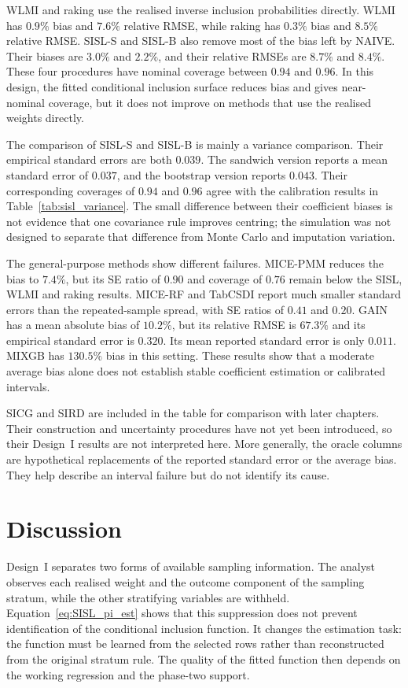 WLMI and raking use the realised inverse inclusion probabilities directly. WLMI has $0.9\%$ bias and $7.6\%$ relative RMSE, while raking has $0.3\%$ bias and $8.5\%$ relative RMSE. SISL-S and SISL-B also remove most of the bias left by NAIVE. Their biases are $3.0\%$ and $2.2\%$, and their relative RMSEs are $8.7\%$ and $8.4\%$. These four procedures have nominal coverage between $0.94$ and $0.96$. In this design, the fitted conditional inclusion surface reduces bias and gives near-nominal coverage, but it does not improve on methods that use the realised weights directly.

The comparison of SISL-S and SISL-B is mainly a variance comparison. Their empirical standard errors are both $0.039$. The sandwich version reports a mean standard error of $0.037$, and the bootstrap version reports $0.043$. Their corresponding coverages of $0.94$ and $0.96$ agree with the calibration results in Table~\ref{tab:sisl_variance}. The small difference between their coefficient biases is not evidence that one covariance rule improves centring; the simulation was not designed to separate that difference from Monte Carlo and imputation variation.

The general-purpose methods show different failures. MICE-PMM reduces the bias to $7.4\%$, but its SE ratio of $0.90$ and coverage of $0.76$ remain below the SISL, WLMI and raking results. MICE-RF and TabCSDI report much smaller standard errors than the repeated-sample spread, with SE ratios of $0.41$ and $0.20$. GAIN has a mean absolute bias of $10.2\%$, but its relative RMSE is $67.3\%$ and its empirical standard error is $0.320$. Its mean reported standard error is only $0.011$. MIXGB has $130.5\%$ bias in this setting. These results show that a moderate average bias alone does not establish stable coefficient estimation or calibrated intervals.

SICG and SIRD are included in the table for comparison with later chapters. Their construction and uncertainty procedures have not yet been introduced, so their Design~I results are not interpreted here. More generally, the oracle columns are hypothetical replacements of the reported standard error or the average bias. They help describe an interval failure but do not identify its cause.

\section{Discussion}
\label{sec:SISL_disc}

Design~I separates two forms of available sampling information. The analyst observes each realised weight and the outcome component of the sampling stratum, while the other stratifying variables are withheld. Equation~\eqref{eq:SISL_pi_est} shows that this suppression does not prevent identification of the conditional inclusion function. It changes the estimation task: the function must be learned from the selected rows rather than reconstructed from the original stratum rule. The quality of the fitted function then depends on the working regression and the phase-two support.

